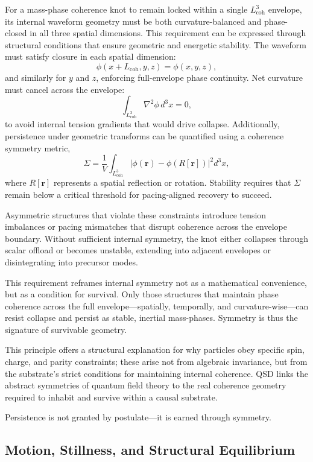\documentclass[entropy,article,submit,pdftex,moreauthors]{Definitions/mdpi}
\begin{document}
For a mass-phase coherence knot to remain locked within a single \texorpdfstring{\( L_{\text{coh}}^3 \)}{Lcoh\^{}3} envelope, its internal waveform geometry must be both curvature-balanced and phase-closed in all three spatial dimensions. This requirement can be expressed through structural conditions that ensure geometric and energetic stability. The waveform must satisfy closure in each spatial dimension:
\[
\phi(x + L_{\text{coh}}, y, z) = \phi(x, y, z),
\]
and similarly for \( y \) and \( z \), enforcing full-envelope phase continuity. Net curvature must cancel across the envelope:
\[
\int_{L_{\text{coh}}^3} \nabla^2 \phi \, d^3x = 0,
\]
to avoid internal tension gradients that would drive collapse. Additionally, persistence under geometric transforms can be quantified using a coherence symmetry metric,
\[
\Sigma = \frac{1}{V} \int_{L_{\text{coh}}^3} \left| \phi(\mathbf{r}) - \phi(R[\mathbf{r}]) \right|^2 d^3x,
\]
where \( R[\mathbf{r}] \) represents a spatial reflection or rotation. Stability requires that \( \Sigma \) remain below a critical threshold for pacing-aligned recovery to succeed.

Asymmetric structures that violate these constraints introduce tension imbalances or pacing mismatches that disrupt coherence across the envelope boundary. Without sufficient internal symmetry, the knot either collapses through scalar offload or becomes unstable, extending into adjacent envelopes or disintegrating into precursor modes.

This requirement reframes internal symmetry not as a mathematical convenience, but as a condition for survival. Only those structures that maintain phase coherence across the full envelope—spatially, temporally, and curvature-wise—can resist collapse and persist as stable, inertial mass-phases. Symmetry is thus the signature of survivable geometry.

This principle offers a structural explanation for why particles obey specific spin, charge, and parity constraints; these arise not from algebraic invariance, but from the substrate’s strict conditions for maintaining internal coherence. QSD links the abstract symmetries of quantum field theory to the real coherence geometry required to inhabit and survive within a causal substrate.

Persistence is not granted by postulate—it is earned through symmetry.

\subsection{Motion, Stillness, and Structural Equilibrium}
\end{document}
